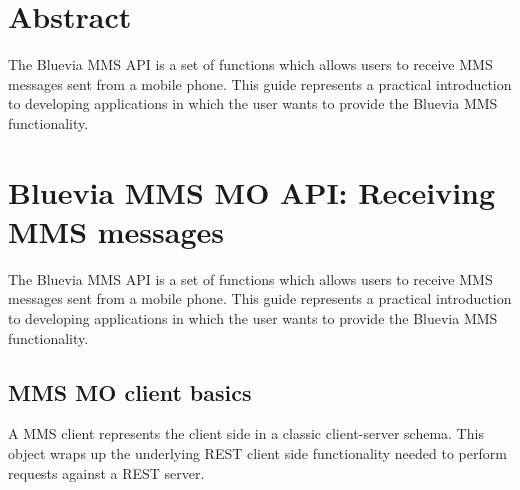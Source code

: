 \hypertarget{blv_mms_mo_guide_mms_mo_abstract_sec}{}\section{Abstract}\label{blv_mms_mo_guide_mms_mo_abstract_sec}
The Bluevia MMS API is a set of functions which allows users to receive MMS messages sent from a mobile phone. This guide represents a practical introduction to developing applications in which the user wants to provide the Bluevia MMS functionality.\hypertarget{blv_mms_mo_guide_blv_mms_mo_api_receiving_mms_messages_sec}{}\section{Bluevia MMS MO API: Receiving MMS messages}\label{blv_mms_mo_guide_blv_mms_mo_api_receiving_mms_messages_sec}
The Bluevia MMS API is a set of functions which allows users to receive MMS messages sent from a mobile phone. This guide represents a practical introduction to developing applications in which the user wants to provide the Bluevia MMS functionality.\hypertarget{blv_mms_mo_guide_mms_mo_client_basics_sec}{}\subsection{MMS MO client basics}\label{blv_mms_mo_guide_mms_mo_client_basics_sec}
A MMS client represents the client side in a classic client-\/server schema. This object wraps up the underlying REST client side functionality needed to perform requests against a REST server.

